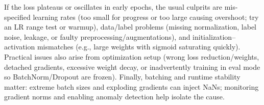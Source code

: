 If the loss plateaus or oscillates in early epochs, the usual culprits are mis-specified learning rates (too small for progress or too large causing overshoot; try an LR range test or warmup), data/label problems (missing normalization, label noise, leakage, or faulty preprocessing/augmentations), and initialization–activation mismatches (e.g., large weights with sigmoid saturating quickly). Practical issues also arise from optimization setup (wrong loss reduction/weights, detached gradients, excessive weight decay, or inadvertently training in eval mode so BatchNorm/Dropout are frozen). Finally, batching and runtime stability matter: extreme batch sizes and exploding gradients can inject NaNs; monitoring gradient norms and enabling anomaly detection help isolate the cause.
